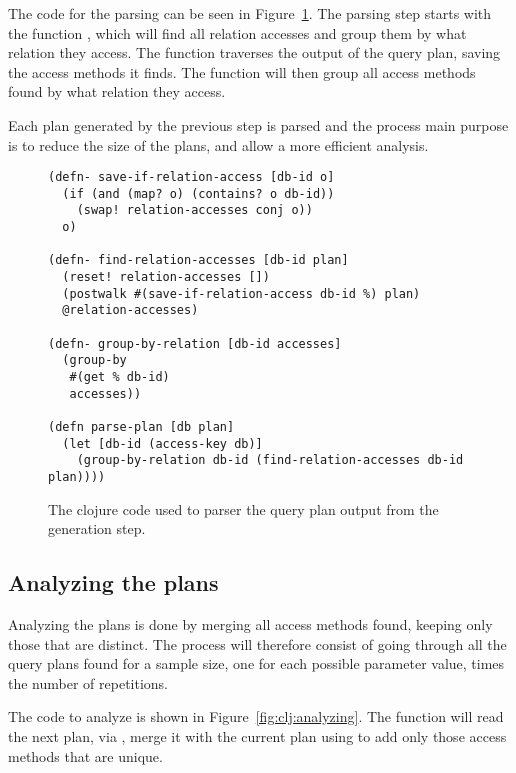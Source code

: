 The code for the parsing can be seen in Figure~\ref{fig:clj:parsing}. The
parsing step starts with the function , which will find all
relation accesses and group them by what relation they access. The function
 traverses the output of the query plan, saving
the access methods it finds. The function  will then
group all access methods found by what relation they access.

Each plan generated by the previous step is parsed and the process main purpose
is to reduce the size of the plans, and allow a more efficient analysis.

\begin{figure}[ht]
\begin{verbatim}
(defn- save-if-relation-access [db-id o]
  (if (and (map? o) (contains? o db-id))
    (swap! relation-accesses conj o))
  o)

(defn- find-relation-accesses [db-id plan]
  (reset! relation-accesses [])
  (postwalk #(save-if-relation-access db-id %) plan)
  @relation-accesses)

(defn- group-by-relation [db-id accesses]
  (group-by
   #(get % db-id)
   accesses))

(defn parse-plan [db plan]
  (let [db-id (access-key db)]
    (group-by-relation db-id (find-relation-accesses db-id plan))))
   \end{verbatim}
   \caption[The clojure code to parse a query]{The clojure code used to parser
     the query plan output from the generation step.}
\label{fig:clj:parsing}
\end{figure}

\subsection{Analyzing the plans}\label{sec:analyzingplans}
Analyzing the plans is done by merging all access methods found, keeping only those
that are distinct. The process will therefore consist of going through all the
query plans found for a sample size, one for each possible parameter value,
times the number of repetitions.

The code to analyze is shown in Figure~\ref{fig:clj:analyzing}. The
 function will read the next plan, via ,
merge it with the current plan using  to add only those
access methods that are unique.


